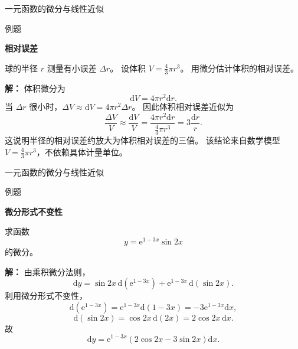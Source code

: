 \documentclass[aspectratio=169,10pt,fontset=fandol]{ctexbeamer}
\newcommand{\dd}{\mathrm{d}}
\newcommand{\ee}{\mathrm{e}}
\begin{document}
\begin{frame}[t,fragile]{一元函数的微分与线性近似}
\normalsize
\begin{block}{例题}
{\normalsize
\textbf{相对误差}\par

球的半径 $r$ 测量有小误差 $\Delta r$。 设体积 $V=\frac43\pi r^3$。 用微分估计体积的相对误差。

}
\end{block}
\pause
{\normalsize
\textbf{解：}
体积微分为
\[
\dd V=4\pi r^2\dd r.
\]
当 $\Delta r$ 很小时，$\Delta V\approx \dd V=4\pi r^2\Delta r$。 因此体积相对误差近似为
\[
\frac{\Delta V}{V}\approx
\frac{\dd V}{V}
=\frac{4\pi r^2\dd r}{\frac43\pi r^3}
=3\frac{\dd r}{r}.
\]
这说明半径的相对误差约放大为体积相对误差的三倍。 该结论来自数学模型 $V=\frac43\pi r^3$，不依赖具体计量单位。

}
\end{frame}
\begin{frame}[t,fragile]{一元函数的微分与线性近似}
\footnotesize
\begin{block}{例题}
{\footnotesize
\textbf{微分形式不变性}\par

求函数
\[
y=\ee^{1-3x}\sin2x
\]
的微分。

}
\end{block}
\pause
{\footnotesize
\textbf{解：}
由乘积微分法则，
\[
\dd y=\sin2x\,\dd(\ee^{1-3x})+\ee^{1-3x}\,\dd(\sin2x).
\]
利用微分形式不变性，
\[
\dd(\ee^{1-3x})=\ee^{1-3x}\dd(1-3x)=-3\ee^{1-3x}\dd x,
\]
\[
\dd(\sin2x)=\cos2x\,\dd(2x)=2\cos2x\,\dd x.
\]
故
\[
\dd y=\ee^{1-3x}(2\cos2x-3\sin2x)\dd x.
\]

}
\end{frame}
\end{document}
